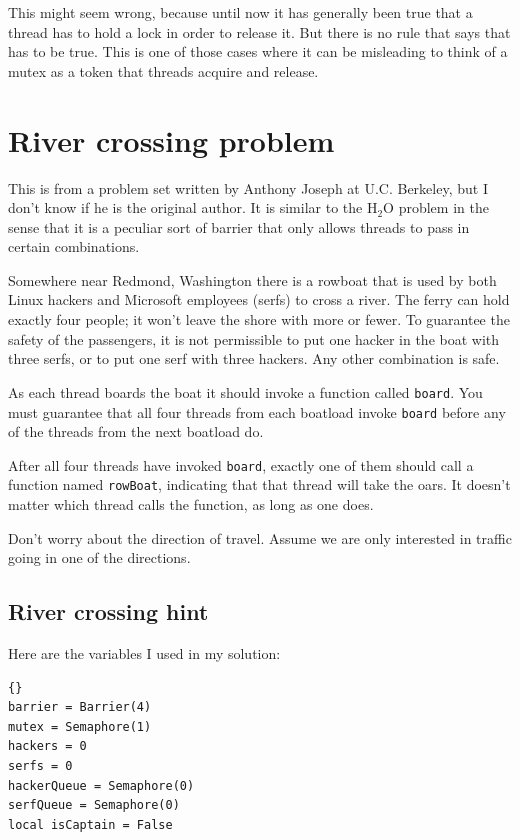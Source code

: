 \documentclass{book}
\newcommand{\clearemptydoublepage}{\newpage\cleardoublepage}
\begin{document}
This might seem wrong, because until now it
has generally been true that a thread has to hold a lock in
order to release it.  But there is no rule that says that has
to be true.  This is one of those cases where it can be misleading
to think of a mutex as a token that threads acquire and release.


\section {River crossing problem}

This is from a problem set written by Anthony Joseph
at U.C. Berkeley, but I don't know if he is the original author.
It is similar to the H$_2$O problem in the sense that it is
a peculiar sort of barrier that only allows threads to pass
in certain combinations.

Somewhere near Redmond, Washington there is a rowboat that is used by
both Linux hackers and Microsoft employees (serfs) to cross a river.  The
ferry can hold exactly four people; it won't leave the shore with more
or fewer.  To guarantee the safety of the passengers, it is not
permissible to put one hacker in the boat with three serfs, or to
put one serf with three hackers.  Any other combination is safe.

As each thread boards the boat it should invoke a function
called {\tt board}.  You must guarantee that all four threads
from each boatload invoke {\tt board} before any of the threads
from the next boatload do.

After all four threads have invoked {\tt board}, exactly one of
them should call a function named {\tt rowBoat}, indicating
that that thread will take the oars.  It doesn't matter which thread
calls the function, as long as one does.

Don't worry about the direction of travel.  Assume we are
only interested in traffic going in one of the directions.


\clearemptydoublepage
\subsection {River crossing hint}

Here are the variables I used in my solution:

\begin{lstlisting}[title={River crossing hint}]{}
barrier = Barrier(4)
mutex = Semaphore(1)
hackers = 0
serfs = 0
hackerQueue = Semaphore(0)
serfQueue = Semaphore(0)
local isCaptain = False
\end{lstlisting}
\end{document}
